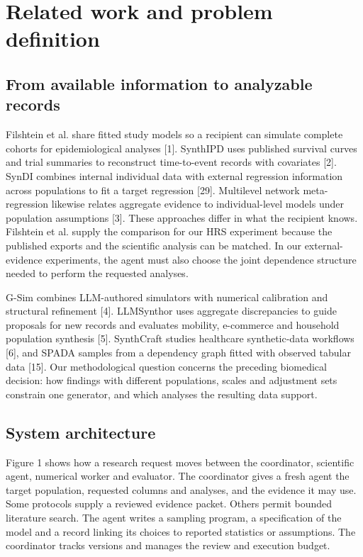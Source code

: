 \documentclass[sigconf,review]{acmart}
\begin{document}
\section{Related work and problem definition}

\subsection{From available information to analyzable records}

Filshtein et al. share fitted study models so a recipient can simulate complete cohorts for epidemiological analyses [1]. SynthIPD uses published survival curves and trial summaries to reconstruct time-to-event records with covariates [2]. SynDI combines internal individual data with external regression information across populations to fit a target regression [29]. Multilevel network meta-regression likewise relates aggregate evidence to individual-level models under population assumptions [3]. These approaches differ in what the recipient knows. Filshtein et al. supply the comparison for our HRS experiment because the published exports and the scientific analysis can be matched. In our external-evidence experiments, the agent must also choose the joint dependence structure needed to perform the requested analyses.


G-Sim combines LLM-authored simulators with numerical calibration and structural refinement [4]. LLMSynthor uses aggregate discrepancies to guide proposals for new records and evaluates mobility, e-commerce and household population synthesis [5]. SynthCraft studies healthcare synthetic-data workflows [6], and SPADA samples from a dependency graph fitted with observed tabular data [15]. Our methodological question concerns the preceding biomedical decision: how findings with different populations, scales and adjustment sets constrain one generator, and which analyses the resulting data support.


\subsection{System architecture}

Figure 1 shows how a research request moves between the coordinator, scientific agent, numerical worker and evaluator. The coordinator gives a fresh agent the target population, requested columns and analyses, and the evidence it may use. Some protocols supply a reviewed evidence packet. Others permit bounded literature search. The agent writes a sampling program, a specification of the model and a record linking its choices to reported statistics or assumptions. The coordinator tracks versions and manages the review and execution budget.
\end{document}
